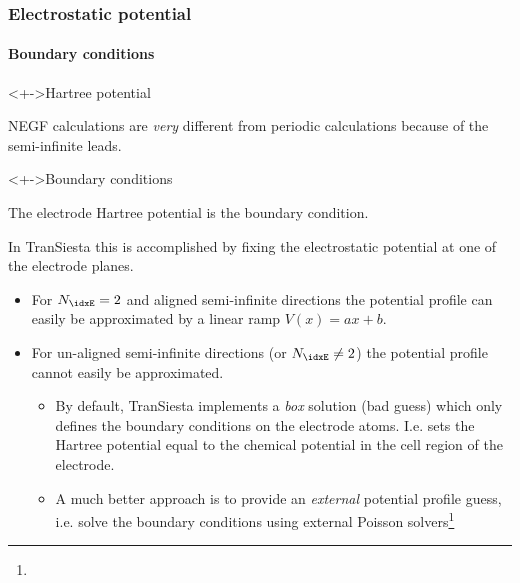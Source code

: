 \begin{frame}
{\begin{center}

  \end{center}}

\end{frame}


\begin{frame}
  \frametitle{Electrostatic potential}
  \framesubtitle{Boundary conditions}

  \begin{block}<+->{Hartree potential}

    NEGF calculations are \emph{very} different from periodic calculations because of the
    semi-infinite leads.

  \end{block}

  \begin{block}<+->{Boundary conditions}

    The electrode Hartree potential is the boundary condition.

    In TranSiesta this is accomplished by fixing the electrostatic potential at one of the
    electrode planes.

    \begin{itemize}
      \item For $N_\idxE=2$ and aligned semi-infinite directions the potential profile can
      easily be approximated by a linear ramp $V(x) = ax+b$.

      \item For un-aligned semi-infinite directions (or $N_\idxE\neq2$) the potential
      profile cannot easily be approximated.

      \begin{itemize}[<+->]
        \item By default, TranSiesta implements a \emph{box} solution (bad guess) which
        only defines the boundary conditions on the electrode atoms. I.e. sets the Hartree
        potential equal to the chemical potential in the cell region of the electrode.

        \item A much better approach is to provide an \emph{external} potential profile
        guess, i.e. solve the boundary conditions using external Poisson
        solvers\footnote{}


\end{itemize}
\end{itemize}
\end{block}
\end{frame}
